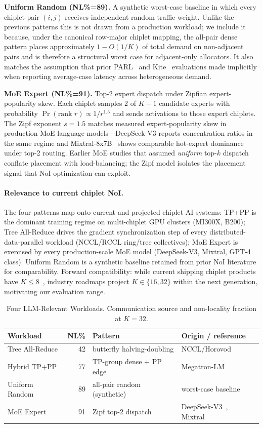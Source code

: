 \textbf{Uniform Random (NL\%=89).}
A synthetic worst-case baseline in which every chiplet pair $(i,j)$
receives independent random traffic weight. Unlike the previous
patterns this is not drawn from a production workload; we include it
because, under the canonical row-major chiplet mapping, the all-pair
dense pattern places approximately $1{-}O(1/K)$ of total demand on
non-adjacent pairs and is therefore a structural worst case for
adjacent-only allocators. It also matches the assumption that
prior PARL~\cite{parl} and Kite~\cite{kite} evaluations made implicitly
when reporting average-case latency across heterogeneous demand.

\textbf{MoE Expert (NL\%=91).}
Top-2 expert dispatch under Zipfian expert-popularity skew. Each
chiplet samples 2 of $K{-}1$ candidate experts with probability
$\Pr(\text{rank } r) \propto 1/r^{1.5}$ and sends activations to
those expert chiplets. The Zipf exponent $s{=}1.5$ matches measured
expert-popularity skew in production MoE language models---DeepSeek-V3
\cite{deepseekv3} reports concentration ratios in the same regime and
Mixtral-8x7B~\cite{mixtral} shows comparable hot-expert dominance
under top-2 routing. Earlier MoE studies that assumed
\textit{uniform} top-$k$ dispatch~\cite{gshard} conflate placement
with load-balancing; the Zipf model isolates the placement signal
that NoI optimization can exploit.

\paragraph{Relevance to current chiplet NoI.}
The four patterns map onto current and projected chiplet AI systems:
TP+PP is the dominant training regime on multi-chiplet GPU clusters
(MI300X, B200); Tree All-Reduce drives the gradient synchronization
step of every distributed-data-parallel workload (NCCL/RCCL ring/tree
collectives); MoE Expert is exercised by every production-scale MoE
model (DeepSeek-V3, Mixtral, GPT-4 class). Uniform Random is a
synthetic baseline retained from prior NoI literature
\cite{kite,florets,parl} for comparability. Forward compatibility:
while current shipping chiplet products have $K{\le}8$~\cite{mi300x},
industry roadmaps project $K{\in}\{16,32\}$ within the next
generation, motivating our evaluation range.

\begin{table}[t]
\centering
\caption{Four LLM-Relevant Workloads. Communication source and
non-locality fraction at $K{=}32$.}
\label{tab:workloads}
\scriptsize
\begin{tabular}{lrll}
\toprule
Workload & NL\% & Pattern & Origin / reference \\
\midrule
Tree All-Reduce & 42 & butterfly halving-doubling
  & NCCL/Horovod~\cite{nccl,thakur2005} \\
Hybrid TP+PP & 77 & TP-group dense + PP edge
  & Megatron-LM~\cite{megatron,megatron3} \\
Uniform Random & 89 & all-pair random (synthetic)
  & worst-case baseline \\
MoE Expert & 91 & Zipf top-2 dispatch
  & DeepSeek-V3~\cite{deepseekv3}, Mixtral~\cite{mixtral} \\
\bottomrule
\end{tabular}
\end{table}
